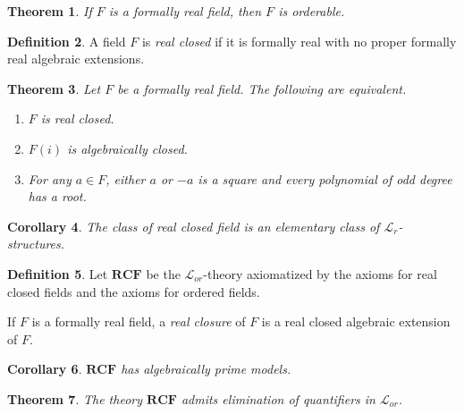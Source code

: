 \documentclass{amsart}
\newtheorem{theorem}{Theorem}[subsection]
\newtheorem{corollary}[theorem]{Corollary}
\theoremstyle{definition}
\newtheorem{definition}[theorem]{Definition}
\numberwithin{equation}{section}
\begin{document}
\begin{theorem}
	If $F$ is a formally real field, then $F$ is orderable.
\end{theorem}

\begin{definition}
	A field $F$ is \emph{real closed} if it is formally real with no proper formally real algebraic extensions.
\end{definition}

\begin{theorem}
	Let $F$ be a formally real field. The following are equivalent.
	\begin{enumerate}[label = {\roman*)}]
		\item $F$ is real closed.
		\item $F(i)$ is algebraically closed.
		\item For any $a\in F$, either $a$ or $-a$ is a square and every polynomial of odd degree has a root.
	\end{enumerate}
\end{theorem}

\begin{corollary}
	The class of real closed field is an elementary class of
	$\mathcal{L}_r$-structures.
\end{corollary}

\begin{definition}
	Let $\mathbf{RCF}$ be the $\mathcal{L}_{or}$-theory axiomatized by the axioms for real closed fields
	and the axioms for ordered fields.

	If $F$ is a formally real field, a \emph{real closure} of $F$ is a real closed algebraic extension of $F$.
\end{definition}


\begin{corollary}
	$\mathbf{RCF}$ has algebraically prime models.
\end{corollary}

\begin{theorem}
	The theory $\mathbf{RCF}$ admits elimination of quantifiers in $\mathcal{L}_{or}$.
\end{theorem}
\end{document}
